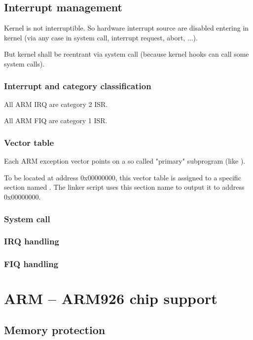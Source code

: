 \subsection{Interrupt management}

Kernel is not interruptible. So hardware interrupt source are disabled entering in kernel (via any case in system call, interrupt request, abort, ...).

But kernel shall be reentrant via system call (because kernel hooks can call some system calls).

\subsubsection{Interrupt and category classification}

All ARM IRQ are category 2 ISR.

All ARM FIQ are category 1 ISR.

\subsubsection{Vector table}

Each ARM exception vector points on a so called "primary" subprogram (like ).

To be located at address 0x00000000, this vector table is assigned to a specific section named . The linker script uses this section name to output it to address 0x00000000.

\subsubsection{System call}

\subsubsection{IRQ handling}

\subsubsection{FIQ handling}

\section{ARM -- ARM926 chip support}

\label{arm926mmu}

\subsection{Memory protection}

